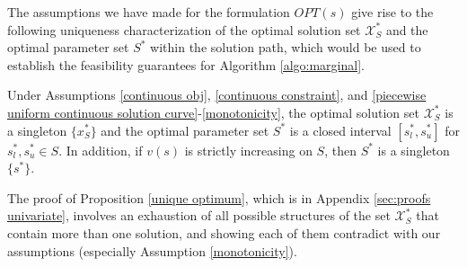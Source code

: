 \documentclass[mnsc,blindrev]{informs4} %
\begin{document}
The assumptions we have made for the formulation $OPT(s)$ give rise to the following uniqueness characterization of the optimal solution set $\mathcal X_S^*$ and the optimal parameter set $S^*$ within the solution path, which would be used to establish the feasibility guarantees for Algorithm \ref{algo:marginal}.
\begin{proposition}\label{unique optimum}
Under Assumptions \ref{continuous obj}, \ref{continuous constraint}, and \ref{piecewise uniform continuous solution curve}-\ref{monotonicity}, the optimal solution set $\mathcal X_S^*$ is a singleton $\{x_S^*\}$ and the optimal parameter set $S^*$ is a closed interval $[s_l^*,s_u^*]$ for $s_l^*,s_u^*\in S$. In addition, if $v(s)$ is strictly increasing on $S$, then $S^*$ is a singleton $\{s^*\}$.
\end{proposition}
The proof of Proposition \ref{unique optimum}, which is in Appendix \ref{sec:proofs univariate}, involves an exhaustion of all possible structures of the set $\mathcal X_S^*$ that contain more than one solution, and showing each of them contradict with our assumptions (especially Assumption \ref{monotonicity}).


\end{document}
